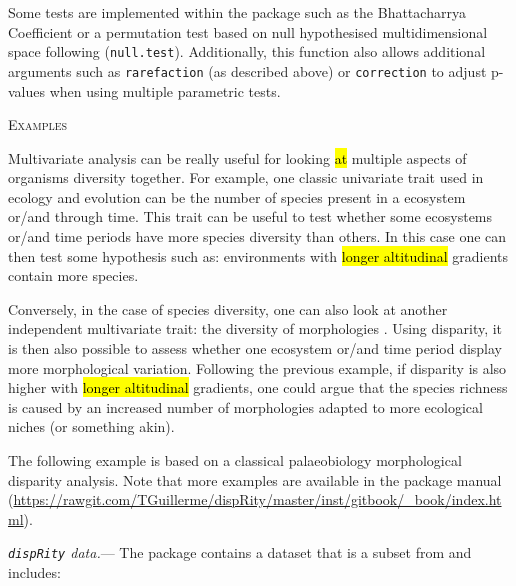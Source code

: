 \documentclass[12pt,letterpaper]{article}
\renewcommand{\section}[1]{%
\bigskip
\begin{center}
\begin{Large}
\normalfont\scshape #1
\medskip
\end{Large}
\end{center}}
\renewcommand{\subsubsection}[1]{%
\vspace{2ex}
\noindent
\textit{#1.}---}
\newcommand{\disp}{\texttt{dispRity} }
\begin{document}
Some tests are implemented within the package such as the Bhattacharrya Coefficient \citep[\texttt{bhatt.coeff};][]{Bhattacharyya,GuillermeCooper} or a permutation test based on null hypothesised multidimensional space following \cite{diaz2016global} (\texttt{null.test}).
Additionally, this function also allows additional arguments such as \texttt{rarefaction} (as described above) or \texttt{correction} to adjust p-values when using multiple parametric tests.

\section{Examples}
Multivariate analysis can be really useful for looking
 \hl{at} 
 multiple aspects of organisms diversity together.
For example, one classic univariate trait used in ecology and evolution can be the number of species present in a ecosystem or/and through time.
This trait can be useful to test whether some ecosystems or/and time periods have more species diversity than others.
In this case one can then test some hypothesis such as: environments with
 \hl{longer altitudinal} 
 gradients contain more species.

Conversely, in the case of species diversity, one can also look at another independent multivariate trait: the diversity of morphologies \citep[or disparity;][]{ruta2013}.
Using disparity, it is then also possible to assess whether one ecosystem or/and time period display more morphological variation.
Following the previous example, if disparity is also higher with
 \hl{longer altitudinal} 
 gradients, one could argue that the species richness is caused by an increased number of morphologies adapted to more ecological niches (or something akin).

The following example is based on a classical palaeobiology morphological disparity analysis.
Note that more examples are available in the package manual (\url{https://rawgit.com/TGuillerme/dispRity/master/inst/gitbook/_book/index.html}).

\subsubsection{\disp data}
The package contains a dataset that is a subset from \cite{beckancient2014} and includes:
\end{document}
